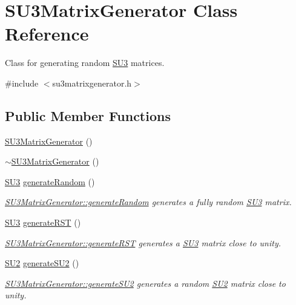 \hypertarget{class_s_u3_matrix_generator}{}\section{S\+U3\+Matrix\+Generator Class Reference}
\label{class_s_u3_matrix_generator}


Class for generating random \mbox{\hyperlink{class_s_u3}{S\+U3}} matrices.  




{\ttfamily \#include $<$su3matrixgenerator.\+h$>$}

\subsection*{Public Member Functions}
\begin{DoxyCompactItemize}
\item 
\mbox{\hyperlink{class_s_u3_matrix_generator_ae76a62a4ba6af03901a0cc8e8632e856}{S\+U3\+Matrix\+Generator}} ()
\item 
\mbox{\hyperlink{class_s_u3_matrix_generator_a58195e1974eed39db617eaea50778f47}{$\sim$\+S\+U3\+Matrix\+Generator}} ()
\item 
\mbox{\hyperlink{class_s_u3}{S\+U3}} \mbox{\hyperlink{class_s_u3_matrix_generator_a06dc59b5a86ba6863b848ef1ca26629a}{generate\+Random}} ()
\begin{DoxyCompactList}\small\item\em \mbox{\hyperlink{class_s_u3_matrix_generator_a06dc59b5a86ba6863b848ef1ca26629a}{S\+U3\+Matrix\+Generator\+::generate\+Random}} generates a fully random \mbox{\hyperlink{class_s_u3}{S\+U3}} matrix. \end{DoxyCompactList}\item 
\mbox{\hyperlink{class_s_u3}{S\+U3}} \mbox{\hyperlink{class_s_u3_matrix_generator_a478a6d34a643f4ee30bc333ca1023b00}{generate\+R\+ST}} ()
\begin{DoxyCompactList}\small\item\em \mbox{\hyperlink{class_s_u3_matrix_generator_a478a6d34a643f4ee30bc333ca1023b00}{S\+U3\+Matrix\+Generator\+::generate\+R\+ST}} generates a \mbox{\hyperlink{class_s_u3}{S\+U3}} matrix close to unity. \end{DoxyCompactList}\item 
\mbox{\hyperlink{class_s_u2}{S\+U2}} \mbox{\hyperlink{class_s_u3_matrix_generator_aa4e04caff654a1df7c43280b85f359bc}{generate\+S\+U2}} ()
\begin{DoxyCompactList}\small\item\em \mbox{\hyperlink{class_s_u3_matrix_generator_aa4e04caff654a1df7c43280b85f359bc}{S\+U3\+Matrix\+Generator\+::generate\+S\+U2}} generates a random \mbox{\hyperlink{class_s_u2}{S\+U2}} matrix close to unity. \end{DoxyCompactList}\item 

\end{DoxyCompactItemize}
